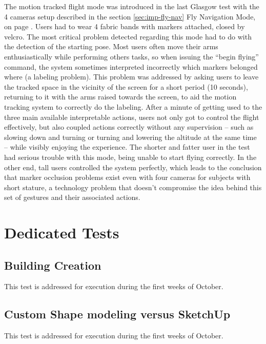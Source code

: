 The motion tracked flight mode was introduced in the last Glasgow test with the 4 cameras
setup described in the section \ref{sec:imp-fly-nav} Fly Navigation Mode, on page \pageref{sec:imp-fly-nav}.
Users had to wear 4 fabric bands with markers attached, closed by velcro.
The most critical problem detected regarding this mode had to do with the detection of the starting pose.
Most users often move their arms enthusiastically while performing others tasks, so when issuing the
``begin flying'' command, the system sometimes interpreted incorrectly which markers belonged where
(a labeling problem). This problem was addressed by asking users to leave the tracked space in the
vicinity of the screen for a short period (10 seconds), returning to it with the arms raised towards
the screen, to aid the motion tracking system to correctly do the labeling.
After a minute of getting used to the three main available interpretable actions, users not only got
to control the flight effectively, but also coupled actions correctly without any supervision
-- such as slowing down and turning or turning and lowering the altitude at the same time --
while visibly enjoying the experience. The shorter and fatter user in the test had serious trouble
with this mode, being unable to start flying correctly. In the other end, tall users controlled the
system perfectly, which leads to the conclusion that marker occlusion problems exist even with
four cameras for subjects with short stature, a technology problem that doesn't compromise the idea
behind this set of gestures and their associated actions.


\section{Dedicated Tests}

\subsection{Building Creation}

This test is addressed for execution during the first weeks of October.

\subsection{Custom Shape modeling versus SketchUp}

This test is addressed for execution during the first weeks of October.

